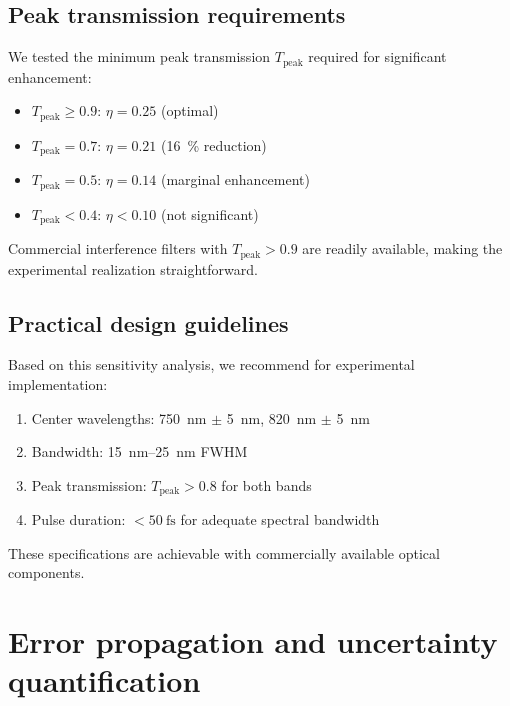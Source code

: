 \documentclass[11pt,a4paper]{article}
\begin{document}
\subsection{Peak transmission requirements}

We tested the minimum peak transmission $T_{\mathrm{peak}}$ required for significant enhancement:

\begin{itemize}
    \item $T_{\mathrm{peak}} \geq 0.9$: $\eta = 0.25$ (optimal)
    \item $T_{\mathrm{peak}} = 0.7$: $\eta = 0.21$ (\SI{16}{\percent} reduction)
    \item $T_{\mathrm{peak}} = 0.5$: $\eta = 0.14$ (marginal enhancement)
    \item $T_{\mathrm{peak}} < 0.4$: $\eta < 0.10$ (not significant)
\end{itemize}

Commercial interference filters with $T_{\mathrm{peak}} > 0.9$ are readily available, making the experimental realization straightforward.

\subsection{Practical design guidelines}

Based on this sensitivity analysis, we recommend for experimental implementation:
\begin{enumerate}
    \item Center wavelengths: \SI{750}{\nano\meter} $\pm$ \SI{5}{\nano\meter}, \SI{820}{\nano\meter} $\pm$ \SI{5}{\nano\meter}
    \item Bandwidth: \SIrange{15}{25}{\nano\meter} FWHM
    \item Peak transmission: $T_{\mathrm{peak}} > 0.8$ for both bands
    \item Pulse duration: $< \SI{50}{\femto\second}$ for adequate spectral bandwidth
\end{enumerate}

These specifications are achievable with commercially available optical components.


\section{Error propagation and uncertainty quantification}
\label{sec:S10}
\end{document}
